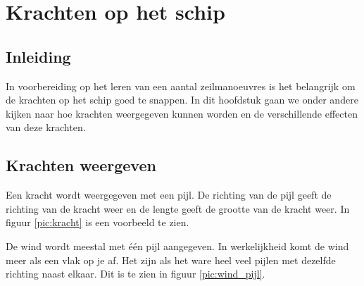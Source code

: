 \chapter{Krachten op het schip}
\section{Inleiding}
In voorbereiding op het leren van een aantal zeilmanoeuvres is het belangrijk om de krachten op het schip goed te snappen. In dit hoofdstuk gaan we onder andere kijken naar hoe krachten weergegeven kunnen worden en de verschillende effecten van deze krachten. 
\section{Krachten weergeven}
Een kracht wordt weergegeven met een pijl. De richting van de pijl geeft de richting van de kracht weer en de lengte geeft de grootte van de kracht weer. In figuur \ref{pic:kracht} is een voorbeeld te zien.

De wind wordt meestal met één pijl aangegeven. In werkelijkheid komt de wind meer als een vlak op je af. Het zijn als het ware heel veel pijlen met dezelfde richting naast elkaar. Dit is te zien in figuur \ref{pic:wind_pijl}.


